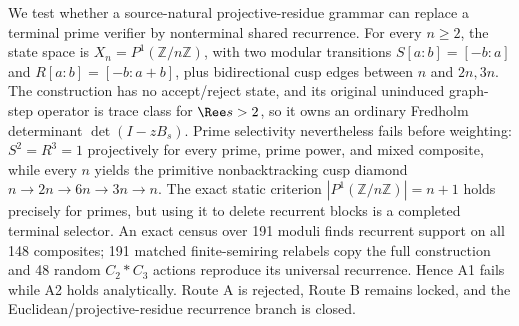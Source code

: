 We test whether a source-natural projective-residue grammar can replace a
terminal prime verifier by nonterminal shared recurrence.  For every
$n\ge2$, the state space is $X_n=P^1(\mathbb Z/n\mathbb Z)$, with two modular
transitions $S[a:b]=[-b:a]$ and $R[a:b]=[-b:a+b]$, plus bidirectional cusp
edges between $n$ and $2n,3n$.  The construction has no accept/reject state,
and its original uninduced graph-step operator is trace class for
$\Ree s>2$, so it owns an ordinary Fredholm determinant
$\det(I-zB_s)$.  Prime selectivity nevertheless fails before weighting:
$S^2=R^3=1$ projectively for every prime, prime power, and mixed composite,
while every $n$ yields the primitive nonbacktracking cusp diamond
$n\to2n\to6n\to3n\to n$.  The exact static criterion
$|P^1(\mathbb Z/n\mathbb Z)|=n+1$ holds precisely for primes, but using it to
delete recurrent blocks is a completed terminal selector.  An exact census
over 191 moduli finds recurrent support on all 148 composites; 191 matched
finite-semiring relabels copy the full construction and 48 random
$C_2*C_3$ actions reproduce its universal recurrence.  Hence A1 fails while
A2 holds analytically.  Route A is rejected, Route B remains locked, and the
Euclidean/projective-residue recurrence branch is closed.
